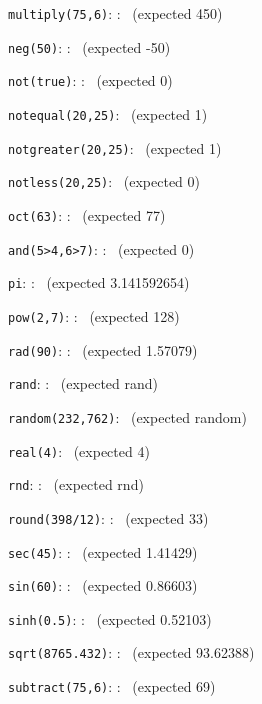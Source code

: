 \documentclass{article}
\begin{document}
\verb|multiply(75,6)|:
    :
   \pgfmathresult\ (expected  450)

\verb|neg(50)|:
    :
   \pgfmathresult\ (expected  -50)

\verb|not(true)|:
    :
   \pgfmathresult\ (expected  0)

\verb|notequal(20,25)|:
   \pgfmathresult\ (expected  1)

\verb|notgreater(20,25)|:
   \pgfmathresult\ (expected  1)

\verb|notless(20,25)|:
   \pgfmathresult\ (expected  0)

\verb|oct(63)|:
    :
   \pgfmathresult\ (expected  77)

\verb|and(5>4,6>7)|:
    :
   \pgfmathresult\ (expected  0)

\verb|pi|:
    :
   \pgfmathresult\ (expected  3.141592654)

\verb|pow(2,7)|:
    :
   \pgfmathresult\ (expected  128)

\verb|rad(90)|:
    :
   \pgfmathresult\ (expected  1.57079)

\verb|rand|:
    :
   \pgfmathresult\ (expected  rand)

\verb|random(232,762)|:
   \pgfmathresult\ (expected  random)

\verb|real(4)|:
   \pgfmathresult\ (expected  4)

\verb|rnd|:
    :
   \pgfmathresult\ (expected  rnd)

\verb|round(398/12)|:
    :
   \pgfmathresult\ (expected  33)

\verb|sec(45)|:
    :
   \pgfmathresult\ (expected  1.41429)

\verb|sin(60)|:
    :
   \pgfmathresult\ (expected  0.86603)

\verb|sinh(0.5)|:
    :
   \pgfmathresult\ (expected  0.52103)

\verb|sqrt(8765.432)|:
    :
   \pgfmathresult\ (expected  93.62388)

\verb|subtract(75,6)|:
    :
   \pgfmathresult\ (expected  69)
\end{document}
